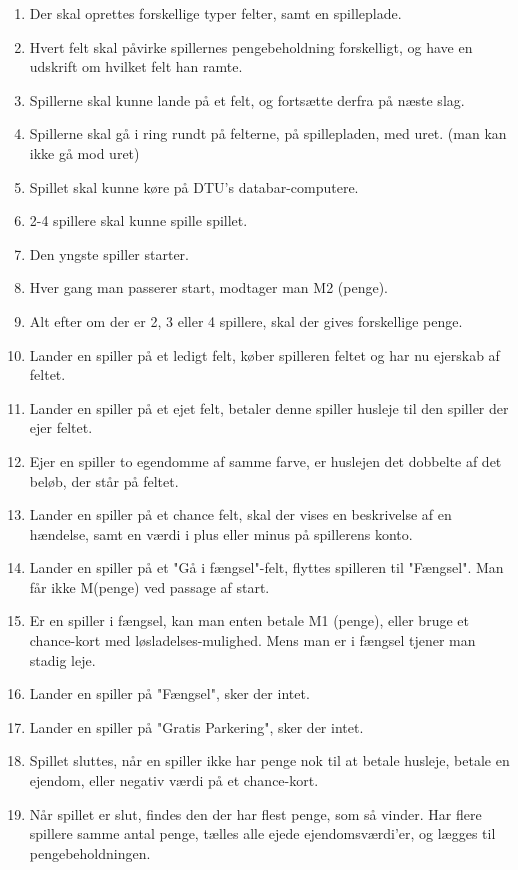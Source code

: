 \begin{enumerate}
\item Der skal oprettes forskellige typer felter, samt en spilleplade.
\item Hvert felt skal påvirke spillernes pengebeholdning forskelligt, og have en udskrift om hvilket felt han ramte.
\item Spillerne skal kunne lande på et felt, og fortsætte derfra på næste slag.

\item Spillerne skal gå i ring rundt på felterne, på spillepladen, med uret. (man kan ikke gå mod uret)
\item Spillet skal kunne køre på DTU's databar-computere.
\item 2-4 spillere skal kunne spille spillet.
\item Den yngste spiller starter.
\item Hver gang man passerer start, modtager man M2 (penge).
\item Alt efter om der er 2, 3 eller 4 spillere, skal der gives forskellige penge.

\item Lander en spiller på et ledigt felt, køber spilleren feltet og har nu ejerskab af feltet.
\item Lander en spiller på et ejet felt, betaler denne spiller husleje til den spiller der ejer feltet.
\item Ejer en spiller to egendomme af samme farve, er huslejen det dobbelte af det beløb, der står på feltet.
\item Lander en spiller på et chance felt, skal der vises en beskrivelse af en hændelse, samt en værdi i plus eller minus på spillerens konto.
\item Lander en spiller på et "Gå i fængsel"-felt, flyttes spilleren til "Fængsel". Man får ikke M(penge) ved passage af start.

\item Er en spiller i fængsel, kan man enten betale M1 (penge), eller bruge et chance-kort med løsladelses-mulighed. Mens man er i fængsel tjener man stadig leje.
\item Lander en spiller på "Fængsel", sker der intet.
\item Lander en spiller på "Gratis Parkering", sker der intet.
\item Spillet sluttes, når en spiller ikke har penge nok til at betale husleje, betale en ejendom, eller negativ værdi på et chance-kort.
\item Når spillet er slut, findes den der har flest penge, som så vinder. Har flere spillere samme antal penge, tælles alle ejede ejendomsværdi'er, og lægges til pengebeholdningen.


\end{enumerate}

